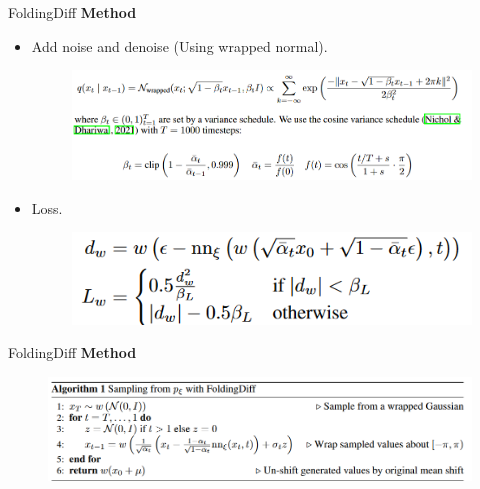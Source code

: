 \documentclass[notheorems, aspectratio=54]{beamer}
\begin{document}
\begin{frame}{FoldingDiff}
  \textbf{Method}
  \begin{itemize}
    \item Add noise and denoise (Using wrapped normal).
    \begin{figure}[!h]
      \centering
      \includegraphics[width=0.9\linewidth]{figures/Foldingdiff_formulation.png}
    \end{figure}
    \item Loss.
    \begin{figure}[!h]
      \centering
      \includegraphics[width=0.6\linewidth]{figures/Folding_loss.png}
    \end{figure}
  \end{itemize}
  \vspace{-3mm}
  \begin{figure}[!h]
      \centering
  \end{figure}
  \vspace{-3mm}
\end{frame}

\begin{frame}{FoldingDiff}
  \textbf{Method}
  \begin{figure}[!h]
    \centering
    \includegraphics[width=1.0\linewidth]{figures/Foldingdiff_algorithm.png}
  \end{figure}
\end{frame}
\end{document}
